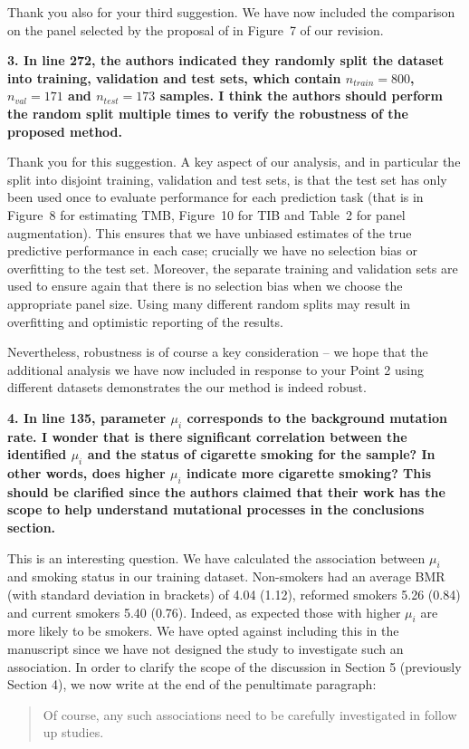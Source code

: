 \documentclass[12pt]{article}
\begin{document}

Thank you also for your third suggestion. We have now included the comparison on the panel selected by the proposal of \citet{lyu_mutation_2018} in Figure~7 of our revision. 

\textbf{3. In line 272, the authors indicated they randomly split the dataset into training, validation and test sets, which contain $n_{train} = 800$, $n_{val} = 171$ and $n_{test} = 173$ samples. I think the authors should perform the random split multiple times to verify the robustness of the proposed method.}

Thank you for this suggestion. A key aspect of our analysis, and in particular the split into disjoint training, validation and test sets, is that the test set has only been used once to evaluate performance for each prediction task (that is in Figure~8 for estimating TMB, Figure~10 for TIB and Table~2 for panel augmentation). This ensures that we have unbiased estimates of the true predictive performance in each case; crucially we have no selection bias or overfitting to the test set. Moreover, the separate training and validation sets are used to ensure again that there is no selection bias when we choose the appropriate panel size. Using many different random splits may result in overfitting and optimistic reporting of the results.  

Nevertheless, robustness is of course a key consideration -- we hope that the additional analysis we have now included in response to your Point 2 using different datasets demonstrates the our method is indeed robust. 

\textbf{4. In line 135, parameter $\mu_i$ corresponds to the background mutation rate. I wonder that is there significant correlation between the identified $\mu_i$ and the status of cigarette smoking for the sample? In other words, does higher $\mu_i$ indicate more cigarette smoking? This should be clarified since the authors claimed that their work has the scope to help understand mutational processes in the conclusions section.}

This is an interesting question.  We have calculated the association between $\mu_i$ and smoking status in our training dataset. Non-smokers had an average BMR (with standard deviation in brackets) of 4.04 (1.12), reformed smokers 5.26 (0.84) and current smokers 5.40 (0.76). Indeed, as expected those with higher $\mu_i$ are more likely to be smokers.  We have opted against including this in the manuscript since we have not designed the study to investigate such an association. In order to clarify the scope of the discussion in Section 5 (previously Section 4), we now write at the end of the penultimate paragraph:
\begin{quotation}
Of course, any such associations need to be carefully investigated in follow up studies.
\end{quotation}
\end{document}

